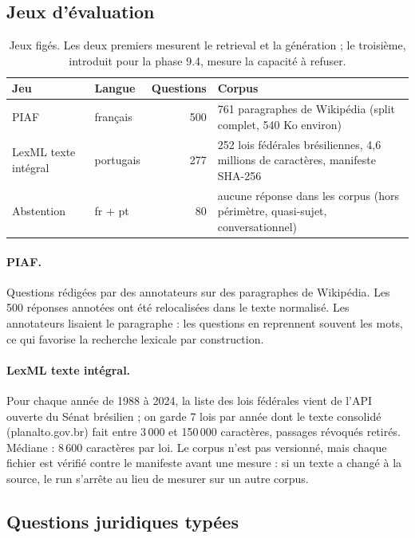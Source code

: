 \documentclass[11pt,a4paper]{article}
\newcommand{\code}[1]{\texttt{\detokenize{#1}}}
\begin{document}
\subsection{Jeux d'évaluation}

\begin{table}[ht]
\centering
\small
\begin{tabularx}{\linewidth}{@{}l l r L@{}}
\toprule
\textbf{Jeu} & \textbf{Langue} & \textbf{Questions} & \textbf{Corpus} \\
\midrule
PIAF & français & 500 & 761 paragraphes de Wikipédia (split \code{train} complet, 540 Ko environ) \\
LexML texte intégral & portugais & 277 & 252 lois fédérales brésiliennes, 4,6 millions de caractères, manifeste SHA-256 \\
Abstention & fr + pt & 80 & aucune réponse dans les corpus (hors périmètre, quasi-sujet, conversationnel) \\
\bottomrule
\end{tabularx}
\caption{Jeux figés. Les deux premiers mesurent le retrieval et la génération ; le troisième, introduit pour la phase 9.4, mesure la capacité à refuser.}
\label{tab:jeux}
\end{table}

\paragraph{PIAF.} Questions rédigées par des annotateurs sur des paragraphes de Wikipédia. Les 500 réponses annotées ont été relocalisées dans le texte normalisé. Les annotateurs lisaient le paragraphe : les questions en reprennent souvent les mots, ce qui favorise la recherche lexicale par construction.

\paragraph{LexML texte intégral.} Pour chaque année de 1988 à 2024, la liste des lois fédérales vient de l'API ouverte du Sénat brésilien ; on garde 7 lois par année dont le texte consolidé (planalto.gov.br) fait entre 3\,000 et 150\,000 caractères, passages révoqués retirés. Médiane : 8\,600 caractères par loi. Le corpus n'est pas versionné, mais chaque fichier est vérifié contre le manifeste avant une mesure : si un texte a changé à la source, le run s'arrête au lieu de mesurer sur un autre corpus.

\subsection{Questions juridiques typées}
\end{document}
